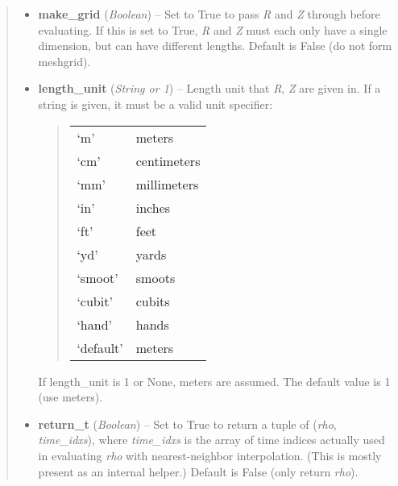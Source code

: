 \documentclass[letterpaper,10pt,english]{sphinxmanual}
\begin{document}
\begin{fulllineitems}
\begin{fulllineitems}
\begin{quote}
\begin{description}
\begin{itemize}
\item {} 
\textbf{make\_grid} (\emph{Boolean}) --
Set to True to pass \emph{R} and \emph{Z} through
 before evaluating. If this is set to
True, \emph{R} and \emph{Z} must each only have a single dimension, but
can have different lengths. Default is False (do not form
meshgrid).

\item {} 
\textbf{length\_unit} (\emph{String or 1}) --
Length unit that \emph{R}, \emph{Z} are given in.
If a string is given, it must be a valid unit specifier:
\begin{quote}

\begin{tabulary}{\linewidth}{|L|L|}
\hline

`m'
 & 
meters
\\

`cm'
 & 
centimeters
\\

`mm'
 & 
millimeters
\\

`in'
 & 
inches
\\

`ft'
 & 
feet
\\

`yd'
 & 
yards
\\

`smoot'
 & 
smoots
\\

`cubit'
 & 
cubits
\\

`hand'
 & 
hands
\\

`default'
 & 
meters
\\
\hline\end{tabulary}

\end{quote}

If length\_unit is 1 or None, meters are assumed. The default
value is 1 (use meters).

\item {} 
\textbf{return\_t} (\emph{Boolean}) --
Set to True to return a tuple of (\emph{rho},
\emph{time\_idxs}), where \emph{time\_idxs} is the array of time indices
actually used in evaluating \emph{rho} with nearest-neighbor
interpolation. (This is mostly present as an internal helper.)
Default is False (only return \emph{rho}).

\end{itemize}


\end{description}
\end{quote}
\end{fulllineitems}
\end{fulllineitems}
\end{document}
